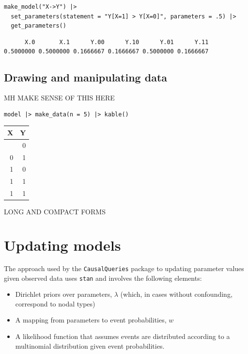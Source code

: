 \documentclass[
  article]{jss}
\providecommand{\tightlist}{%
  \setlength{\itemsep}{0pt}\setlength{\parskip}{0pt}}\usepackage{longtable,booktabs,array}
\begin{document}
\begin{verbatim}
make_model("X->Y") |>
  set_parameters(statement = "Y[X=1] > Y[X=0]", parameters = .5) |>
  get_parameters()
\end{verbatim}

\begin{verbatim}
      X.0       X.1      Y.00      Y.10      Y.01      Y.11 
0.5000000 0.5000000 0.1666667 0.1666667 0.5000000 0.1666667 
\end{verbatim}

\hypertarget{drawing-and-manipulating-data}{%
\subsection{Drawing and manipulating
data}\label{drawing-and-manipulating-data}}

MH MAKE SENSE OF THIS HERE

\begin{verbatim}
model |> make_data(n = 5) |> kable()
\end{verbatim}

\begin{longtable}[]{@{}rr@{}}
\toprule\noalign{}
X & Y \\
\midrule\noalign{}
\endhead
\bottomrule\noalign{}
\endlastfoot
0 & 0 \\
0 & 1 \\
1 & 0 \\
1 & 1 \\
1 & 1 \\
\end{longtable}

LONG AND COMPACT FORMS

\hypertarget{updating-models}{%
\section{Updating models}\label{updating-models}}

The approach used by the \texttt{CausalQueries} package to updating
parameter values given observed data uses \texttt{stan} and involves the
following elements:

\begin{itemize}
\tightlist
\item
  Dirichlet priors over parameters, \(\lambda\) (which, in cases without
  confounding, correspond to nodal types)
\item
  A mapping from parameters to event probabilities, \(w\)
\item
  A likelihood function that assumes events are distributed according to
  a multinomial distribution given event probabilities.
\end{itemize}
\end{document}
